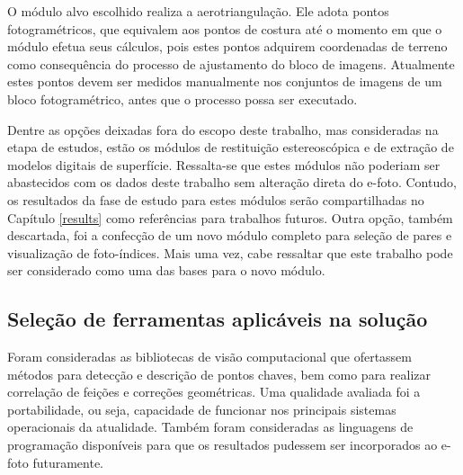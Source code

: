 O módulo alvo escolhido realiza a aerotriangulação. Ele adota pontos fotogramétricos, que equivalem aos pontos de costura até o momento em que o módulo efetua seus cálculos, pois estes pontos adquirem coordenadas de terreno como consequência do processo de ajustamento do bloco de imagens. Atualmente estes pontos devem ser medidos manualmente nos conjuntos de imagens de um bloco fotogramétrico, antes que o processo possa ser executado.

Dentre as opções deixadas fora do escopo deste trabalho, mas consideradas na etapa de estudos, estão os módulos de restituição estereoscópica e de extração de modelos digitais de superfície. Ressalta-se que estes módulos não poderiam ser abastecidos com os dados deste trabalho sem alteração direta do e-foto. Contudo, os resultados da fase de estudo para estes módulos serão compartilhadas no Capítulo \ref{results} como referências para trabalhos futuros. Outra opção, também descartada, foi a confecção de um novo módulo completo para seleção de pares e visualização de foto-índices. Mais uma vez, cabe ressaltar que este trabalho pode ser considerado como uma das bases para o novo módulo.
 

\subsection{Seleção de ferramentas aplicáveis na solução}

Foram consideradas as bibliotecas de visão computacional que ofertassem métodos para detecção e descrição de pontos chaves, bem como para realizar correlação de feições e correções geométricas. Uma qualidade avaliada foi a portabilidade, ou seja, capacidade de funcionar nos principais sistemas operacionais da atualidade. Também foram consideradas as linguagens de programação disponíveis para que os resultados pudessem ser incorporados ao e-foto futuramente.

